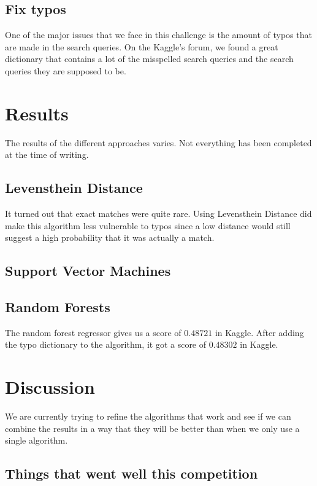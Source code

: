 \documentclass{article}
\begin{document}
\subsection{Fix typos}
One of the major issues that we face in this challenge is the amount of typos that are made in the search queries. 
On the Kaggle's forum, we found a great dictionary that contains a lot of the misspelled search queries and the search queries they are supposed to be.

\section{Results}

The results of the different approaches varies. Not everything has been completed at the time of writing.

\subsection{Levensthein Distance}
It turned out that exact matches were quite rare. Using Levensthein Distance did make this algorithm less vulnerable to typos since a low distance would still suggest a high probability that it was actually a match.

\subsection{Support Vector Machines}

\subsection{Random Forests}
The random forest regressor gives us a score of $0.48721$ in Kaggle. After adding the typo dictionary to the algorithm, it got a score of $0.48302$ in Kaggle.


\section{Discussion}

We are currently trying to refine the algorithms that work and see if we can combine the results in a way that they will be better than when we only use a single algorithm.\\

\subsection{Things that went well this competition}
\end{document}
